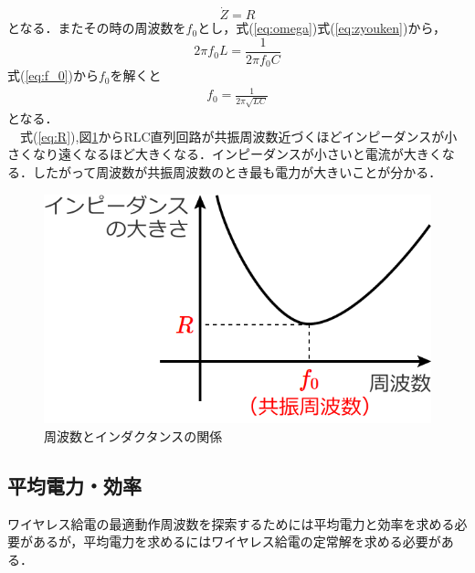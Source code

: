 \documentclass[12pt]{jarticle}
\begin{document}
\begin{equation}
\dot{Z}=R
\label{eq:R}
\end{equation}
となる．またその時の周波数を$f_0$とし，式(\ref{eq:omega})式(\ref{eq:zyouken})から，
\begin{equation}
2 \pi f_0L=\frac{1}{2 \pi f_0C}
\label{eq:f_0}
\end{equation}
式(\ref{eq:f_0})から$f_0を解くと$
\begin{eqnarray}
f_0=\frac{1}{2 \pi\sqrt{LC}}
\label{eq:kyousin}
\end{eqnarray}
となる．
\\　式(\ref{eq:R}),図\ref{fig:RLCkyosin}からRLC直列回路が共振周波数近づくほどインピーダンスが小さくなり遠くなるほど大きくなる．インピーダンスが小さいと電流が大きくなる．したがって周波数が共振周波数のとき最も電力が大きいことが分かる．
\begin{figure}[H]
	\centering
	\includegraphics[scale=0.5]{RLCkyousin.png}
	\caption{周波数とインダクタンスの関係}
	\label{fig:RLCkyosin}
\end{figure}
\subsection{平均電力・効率}
ワイヤレス給電の最適動作周波数を探索するためには平均電力と効率を求める必要があるが，平均電力を求めるにはワイヤレス給電の定常解を求める必要がある．
\end{document}
